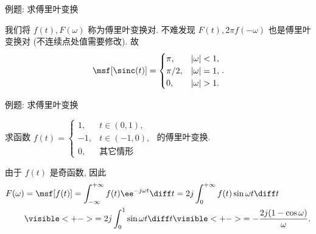 \begin{frame}{例题: 求傅里叶变换}
	\onslide<+->
	\begin{center}
	\end{center}
	\onslide<+->
	我们将 $f(t),F(\omega)$ 称为傅里叶变换对.
	\onslide<+->
	不难发现 $F(t),2\pi f(-\omega)$ 也是傅里叶变换对 (不连续点处值需要修改).
	\onslide<+->
	故
	\[\msf[\sinc(t)]=\begin{cases}
		\pi,&|\omega|<1,\\
		\pi/2,&|\omega|=1,\\
		0,&|\omega|>1.
		\end{cases}.
	\]
\end{frame}


\begin{frame}{例题: 求傅里叶变换}
	\onslide<+->
	\begin{example}
		求函数 $f(t)=
			\begin{cases}
				1,&t\in(0,1),\\
				-1,&t\in(-1,0),\\
				0,&\text{其它情形}
			\end{cases}$
		的傅里叶变换.
	\end{example}

	\onslide<+->
	\begin{solution}
		由于 $f(t)$ 是奇函数, 因此
		\begin{align*}
			F(\omega)&=\msf[f(t)]
			=\int_{-\infty}^{+\infty}f(t)\ee^{-j\omega t}\diff t
			=2j\int_0^{+\infty}f(t)\sin{\omega t}\diff t\\
			&\visible<+->{=2j\int_0^1\sin{\omega t}\diff t}
			\visible<+->{=-\frac{2j(1-\cos\omega)}\omega.}
		\end{align*}
	\end{solution}
\end{frame}


